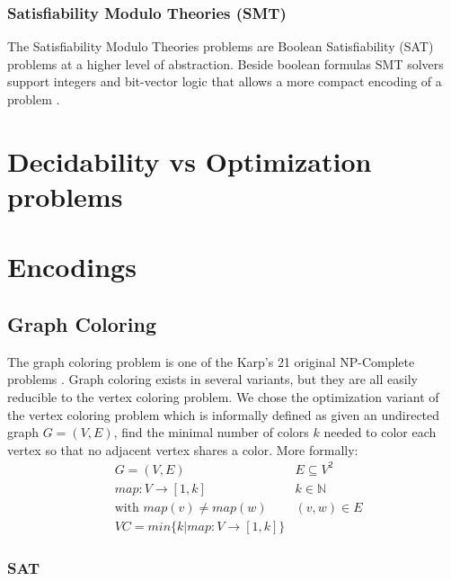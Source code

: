 \documentclass{sig-alternate}
\begin{document}
\subsubsection*{Satisfiability Modulo Theories (SMT)}
The Satisfiability Modulo Theories problems are Boolean Satisfiability (SAT) problems at a higher level of abstraction. Beside boolean formulas SMT solvers support integers and bit-vector logic that allows a more compact encoding of a problem \cite{wille2008using}.

\section{Decidability vs Optimization problems}

\section{Encodings}

\subsection{Graph Coloring}

The graph coloring problem is one of the Karp's 21 original NP-Complete problems \cite{karp1972reducibility}.
Graph coloring exists in several variants, but they are all easily reducible to the vertex coloring problem. We chose the optimization variant of the vertex coloring problem which is informally defined as given an undirected graph $G = (V,E)$, find the minimal number of colors $k$ needed to color each vertex so that no adjacent vertex shares a color. More formally:
\begin{subequations}
\begin{align*}
        & G = (V,E) & E \subseteq V^2\\
        & map : V \rightarrow [1,k] & k \in \mathbb{N} \\
        & \text{with } map(v) \neq map(w) & (v,w) \in E \\
        & VC = min\{k | map : V \rightarrow [1,k]\}
\end{align*}
\end{subequations}


\subsubsection{SAT}
\end{document}
